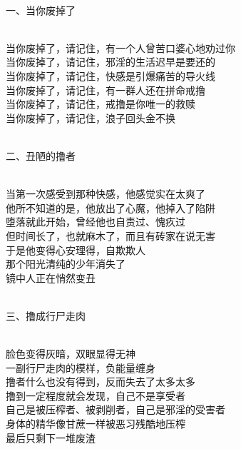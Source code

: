 \begin{poem}
    \begin{adjustwidth}{-4em}{-4em}
        \begin{multicols}{2}
            \begin{center}~\\
                一、当你废掉了

                ~\\

                当你废掉了，请记住，有一个人曾苦口婆心地劝过你 \\ 当你废掉了，请记住，邪淫的生活迟早是要还的 \\ 当你废掉了，请记住，快感是引爆痛苦的导火线 \\ 当你废掉了，请记住，有一群人还在拼命戒撸 \\ 当你废掉了，请记住，戒撸是你唯一的救赎 \\ 当你废掉了，请记住，浪子回头金不换

                ~\\

                二、丑陋的撸者

                ~\\

                当第一次感受到那种快感，他感觉实在太爽了 \\ 他所不知道的是，他放出了心魔，他掉入了陷阱 \\ 堕落就此开始，曾经他也自责过、愧疚过 \\ 但时间长了，也就麻木了，而且有砖家在说无害 \\ 于是他变得心安理得，自欺欺人 \\ 那个阳光清纯的少年消失了 \\ 镜中人正在悄然变丑

                ~\\

                三、撸成行尸走肉

                ~\\

                脸色变得灰暗，双眼显得无神 \\ 一副行尸走肉的模样，负能量缠身 \\ 撸者什么也没有得到，反而失去了太多太多 \\ 撸到一定程度就会发现，自己不是享受者 \\ 自己是被压榨者、被剥削者，自己是邪淫的受害者 \\ 身体的精华像甘蔗一样被恶习残酷地压榨 \\ 最后只剩下一堆废渣


\end{center}
\end{multicols}
\end{adjustwidth}
\end{poem}
